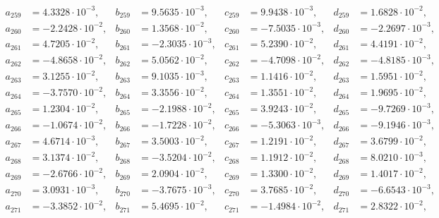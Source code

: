 \begin{align*}
  a_{ 259 } &= 4.3328 \cdot 10^{ -3 }, & b_{ 259 } &= 9.5635 \cdot 10^{ -3 }, & c_{ 259 } &= 9.9438 \cdot 10^{ -3 }, & d_{ 259 } &= 1.6828 \cdot 10^{ -2 }, \\ 
  a_{ 260 } &= -2.2428 \cdot 10^{ -2 }, & b_{ 260 } &= 1.3568 \cdot 10^{ -2 }, & c_{ 260 } &= -7.5035 \cdot 10^{ -3 }, & d_{ 260 } &= -2.2697 \cdot 10^{ -3 }, \\ 
  a_{ 261 } &= 4.7205 \cdot 10^{ -2 }, & b_{ 261 } &= -2.3035 \cdot 10^{ -3 }, & c_{ 261 } &= 5.2390 \cdot 10^{ -2 }, & d_{ 261 } &= 4.4191 \cdot 10^{ -2 }, \\ 
  a_{ 262 } &= -4.8658 \cdot 10^{ -2 }, & b_{ 262 } &= 5.0562 \cdot 10^{ -2 }, & c_{ 262 } &= -4.7098 \cdot 10^{ -2 }, & d_{ 262 } &= -4.8185 \cdot 10^{ -3 }, \\ 
  a_{ 263 } &= 3.1255 \cdot 10^{ -2 }, & b_{ 263 } &= 9.1035 \cdot 10^{ -3 }, & c_{ 263 } &= 1.1416 \cdot 10^{ -2 }, & d_{ 263 } &= 1.5951 \cdot 10^{ -2 }, \\ 
  a_{ 264 } &= -3.7570 \cdot 10^{ -2 }, & b_{ 264 } &= 3.3556 \cdot 10^{ -2 }, & c_{ 264 } &= 1.3551 \cdot 10^{ -2 }, & d_{ 264 } &= 1.9695 \cdot 10^{ -2 }, \\ 
  a_{ 265 } &= 1.2304 \cdot 10^{ -2 }, & b_{ 265 } &= -2.1988 \cdot 10^{ -2 }, & c_{ 265 } &= 3.9243 \cdot 10^{ -2 }, & d_{ 265 } &= -9.7269 \cdot 10^{ -3 }, \\ 
  a_{ 266 } &= -1.0674 \cdot 10^{ -2 }, & b_{ 266 } &= -1.7228 \cdot 10^{ -2 }, & c_{ 266 } &= -5.3063 \cdot 10^{ -3 }, & d_{ 266 } &= -9.1946 \cdot 10^{ -3 }, \\ 
  a_{ 267 } &= 4.6714 \cdot 10^{ -3 }, & b_{ 267 } &= 3.5003 \cdot 10^{ -2 }, & c_{ 267 } &= 1.2191 \cdot 10^{ -2 }, & d_{ 267 } &= 3.6799 \cdot 10^{ -2 }, \\ 
  a_{ 268 } &= 3.1374 \cdot 10^{ -2 }, & b_{ 268 } &= -3.5204 \cdot 10^{ -2 }, & c_{ 268 } &= 1.1912 \cdot 10^{ -2 }, & d_{ 268 } &= 8.0210 \cdot 10^{ -3 }, \\ 
  a_{ 269 } &= -2.6766 \cdot 10^{ -2 }, & b_{ 269 } &= 2.0904 \cdot 10^{ -2 }, & c_{ 269 } &= 1.3300 \cdot 10^{ -2 }, & d_{ 269 } &= 1.4017 \cdot 10^{ -2 }, \\ 
  a_{ 270 } &= 3.0931 \cdot 10^{ -3 }, & b_{ 270 } &= -3.7675 \cdot 10^{ -3 }, & c_{ 270 } &= 3.7685 \cdot 10^{ -2 }, & d_{ 270 } &= -6.6543 \cdot 10^{ -3 }, \\ 
  a_{ 271 } &= -3.3852 \cdot 10^{ -2 }, & b_{ 271 } &= 5.4695 \cdot 10^{ -2 }, & c_{ 271 } &= -1.4984 \cdot 10^{ -2 }, & d_{ 271 } &= 2.8322 \cdot 10^{ -2 }, \\ 

\end{align*}
